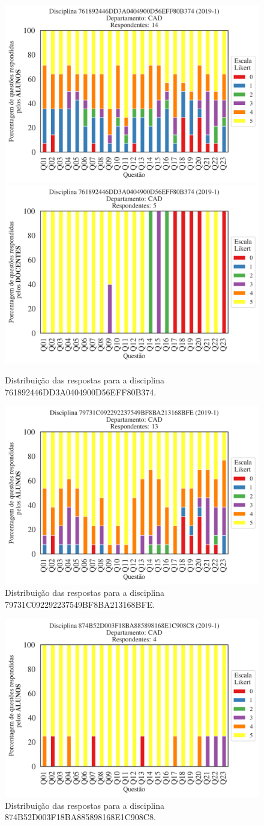 \documentclass[a4paper,10pt]{article}
\begin{document}
\begin{figure}[h]
\centering
\includegraphics[width=0.485\linewidth]{analise_disciplina_departamento_CAD_ALUNO_TURMA_761892446DD3A0404900D56EFF80B374.png}
\includegraphics[width=0.485\linewidth]{analise_disciplina_departamento_CAD_DOCENTE_TURMA_761892446DD3A0404900D56EFF80B374.png}
\caption{\label{fig:analise_geral_departamento}                Distribuição das respostas para a disciplina 761892446DD3A0404900D56EFF80B374.}
\end{figure}
\begin{figure}[h]
\centering
\includegraphics[width=0.485\linewidth]{analise_disciplina_departamento_CAD_ALUNO_TURMA_79731C092292237549BF8BA213168BFE.png}
\caption{\label{fig:analise_geral_departamento}                Distribuição das respostas para a disciplina 79731C092292237549BF8BA213168BFE.}
\end{figure}
\begin{figure}[h]
\centering
\includegraphics[width=0.485\linewidth]{analise_disciplina_departamento_CAD_ALUNO_TURMA_874B52D003F18BA885898168E1C908C8.png}
\caption{\label{fig:analise_geral_departamento}                Distribuição das respostas para a disciplina 874B52D003F18BA885898168E1C908C8.}
\end{figure}
\end{document}
